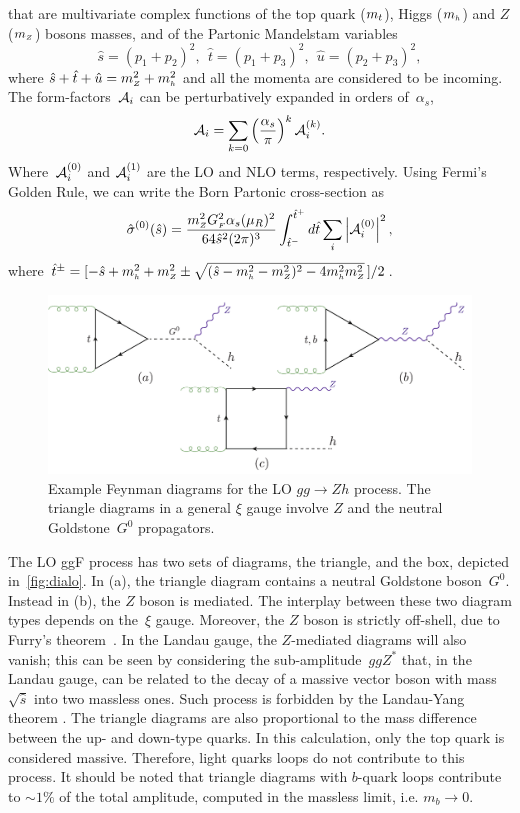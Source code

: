 that are multivariate complex functions of the
top quark ($m_t$), Higgs ($m_{ \scriptscriptstyle h}$) and $Z$ ($m_{ \scriptscriptstyle Z}$) bosons masses, and of the Partonic Mandelstam variables
\begin{equation}
	\hat{s}=(p_1+p_2)^2,~~ \hat{t}=(p_1+p_3)^2,~~ \hat{u}=(p_2+p_3)^2,
\end{equation}
where $\hat{s}+\hat{t}+\hat{u}=m_{ \scriptscriptstyle Z}^2+m_{ \scriptscriptstyle h}^2$ and all the momenta are considered to
be incoming. 
The form-factors~${\cal A}_i$ can be perturbatively expanded in orders of~$\alpha_s$, 
\begin{equation}
	{\cal A}_{i} = \sum_{k=0} \left(\frac{\alpha_s}{\pi} \right) ^k {\cal A}_i^{(k)}.
	\label{eq:ampexp}
\end{equation}
Where~${\cal A}_i^{(0)}$ and ${\cal A}_i^{(1)}$ are the LO and NLO terms, respectively. Using Fermi's Golden Rule, we can write the Born Partonic cross-section as
\begin{equation}
	\hat{\sigma}^{(0)}(\hat{s})=
	\frac{m_{ \scriptscriptstyle Z}^2 G_{ \scriptscriptstyle F}^2 \alpha_s(\mu_R)^2}{64 \hat{s}^2(2\pi)^3}
	\int^{\hat{t}^+}_{\hat{t}^-}d\hat{t}\sum_i \left|{\cal A}_i^{(0)}\right|^2,
\end{equation}
where
$\hat{t}^\pm=[-\hat{s}+m_{ \scriptscriptstyle h}^2+m_{ \scriptscriptstyle Z}^2\pm\sqrt{(\hat{s}-m_{ \scriptscriptstyle h}^2-m_{ \scriptscriptstyle Z}^2)^2-4m_{ \scriptscriptstyle h}^2m_{ \scriptscriptstyle Z}^2}\,]/2$.
\begin{figure}
	\begin{center}
		\includegraphics[width=12cm]{./figures/Feynman_LO}
		\caption{Example Feynman diagrams for the LO $gg \to Zh$ process. The triangle diagrams in a general $\xi$ gauge involve $Z$ and the neutral Goldstone~$G^0$ propagators. }
		\label{fig:dialo}
	\end{center}
\end{figure}
\par The LO ggF process has two sets of diagrams, the triangle, and the box, depicted in~\autoref{fig:dialo}. In (a), the triangle diagram contains a neutral Goldstone boson~$G^0$. Instead in (b), the $Z$ boson is mediated. The interplay between these two diagram types depends on the~$\xi$ gauge. Moreover, the $Z$ boson is strictly off-shell, due to Furry's theorem~\cite{PhysRev.51.125}.
In the Landau gauge, the $Z$-mediated diagrams will also vanish; this can be seen by considering the sub-amplitude~$ggZ^*$ that, in the Landau gauge, can be related to the decay of a massive vector boson
with mass $\sqrt{\hat{s}}$ into two massless ones. Such process is
forbidden by the Landau-Yang theorem \cite{Landau:1948kw, Yang:1950rg}.
The triangle diagrams are also proportional to the mass difference between the up- and down-type quarks. In this calculation, only the top quark is considered massive. Therefore, light quarks loops do not contribute to this process. It should be noted that triangle diagrams with $b$-quark loops contribute to $ \sim 1\%$ of the total amplitude, computed in the massless limit, i.e. $m_b \to 0$.  
